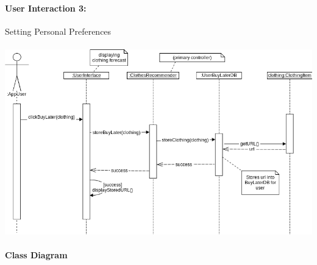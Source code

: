 \documentclass[12pt,a4paper]{article}
\begin{document}
\paragraph{User Interaction 3:} Setting Personal Preferences\\\\
\includegraphics[scale=0.5]{uc_03_savefashionsuggestion.png}



\paragraph{Class Diagram}
\end{document}

